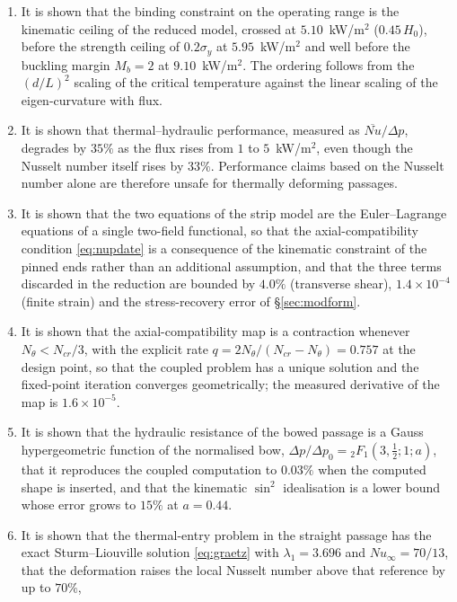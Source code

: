 \documentclass[11pt,a4paper]{article}
\begin{document}
\begin{enumerate}
$30.7\%$ at $10$~kW/m$^2$. The axial-compatibility update of
\eqref{eq:nupdate} is therefore required for quantitative work above about
$2.5$~kW/m$^2$, and for any stress calculation at the operating ceiling.
\item It is shown that the binding constraint on the operating range is the kinematic ceiling
of the reduced model, crossed at $5.10$~kW/m$^2$ ($0.45\,H_0$), before the
strength ceiling of $0.2\sigma_y$ at $5.95$~kW/m$^2$ and well before the
buckling margin $M_b=2$ at $9.10$~kW/m$^2$. The ordering follows from the
$(d/L)^2$ scaling of the critical temperature against the linear scaling of
the eigen-curvature with flux.
\item It is shown that thermal--hydraulic performance, measured as $\overline{Nu}/\Delta p$,
degrades by $35\%$ as the flux rises from $1$ to $5$~kW/m$^2$, even though the
Nusselt number itself rises by $33\%$. Performance claims based on the
Nusselt number alone are therefore unsafe for thermally deforming passages.
\item It is shown that the two equations of the strip model are the Euler--Lagrange
equations of a single two-field functional, so that the axial-compatibility condition
\eqref{eq:nupdate} is a consequence of the kinematic constraint of the pinned ends rather than
an additional assumption, and that the three terms discarded in the reduction are bounded by
$4.0\%$ (transverse shear), $1.4\times10^{-4}$ (finite strain) and the stress-recovery error
of \S\ref{sec:modform}.
\item It is shown that the axial-compatibility map is a contraction whenever
$N_\theta<N_{cr}/3$, with the explicit rate $q=2N_\theta/(N_{cr}-N_\theta)=0.757$ at the
design point, so that the coupled problem has a unique solution and the fixed-point iteration
converges geometrically; the measured derivative of the map is $1.6\times10^{-5}$.
\item It is shown that the hydraulic resistance of the bowed passage is a Gauss hypergeometric
function of the normalised bow, $\Delta p/\Delta p_0={}_2F_1(3,\tfrac12;1;a)$, that it
reproduces the coupled computation to $0.03\%$ when the computed shape is inserted, and that
the kinematic $\sin^2$ idealisation is a lower bound whose error grows to $15\%$ at
$a=0.44$.
\item It is shown that the thermal-entry problem in the straight passage has the exact
Sturm--Liouville solution \eqref{eq:graetz} with $\lambda_1=3.696$ and $Nu_\infty=70/13$,
that the deformation raises the local Nusselt number above that reference by up to $70\%$,

\end{enumerate}
\end{document}
